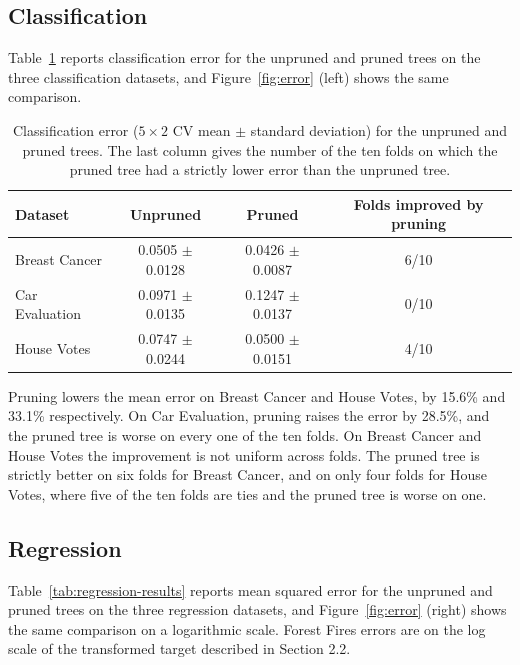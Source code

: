 \documentclass[twoside,11pt]{article}
\begin{document}
\subsection{Classification}
Table~\ref{tab:classification-results} reports classification error for the unpruned and pruned trees on the three classification datasets, and Figure~\ref{fig:error} (left) shows the same comparison.

\begin{table}[h]
    \centering
    \begin{tabular}{lccc}
    \hline
    Dataset & Unpruned & Pruned & Folds improved by pruning \\
    \hline
    Breast Cancer   & 0.0505 $\pm$ 0.0128 & 0.0426 $\pm$ 0.0087 & 6/10 \\
    Car Evaluation  & 0.0971 $\pm$ 0.0135 & 0.1247 $\pm$ 0.0137 & 0/10 \\
    House Votes     & 0.0747 $\pm$ 0.0244 & 0.0500 $\pm$ 0.0151 & 4/10 \\
    \hline
    \end{tabular}
    \caption{Classification error ($5 \times 2$ CV mean $\pm$ standard deviation) for the unpruned and pruned trees. The last column gives the number of the ten folds on which the pruned tree had a strictly lower error than the unpruned tree.}
    \label{tab:classification-results}
\end{table}

Pruning lowers the mean error on Breast Cancer and House Votes, by 15.6\% and 33.1\% respectively. On Car Evaluation, pruning raises the error by 28.5\%, and the pruned tree is worse on every one of the ten folds. On Breast Cancer and House Votes the improvement is not uniform across folds. The pruned tree is strictly better on six folds for Breast Cancer, and on only four folds for House Votes, where five of the ten folds are ties and the pruned tree is worse on one.

\subsection{Regression}
Table~\ref{tab:regression-results} reports mean squared error for the unpruned and pruned trees on the three regression datasets, and Figure~\ref{fig:error} (right) shows the same comparison on a logarithmic scale. Forest Fires errors are on the log scale of the transformed target described in Section 2.2.
\end{document}
